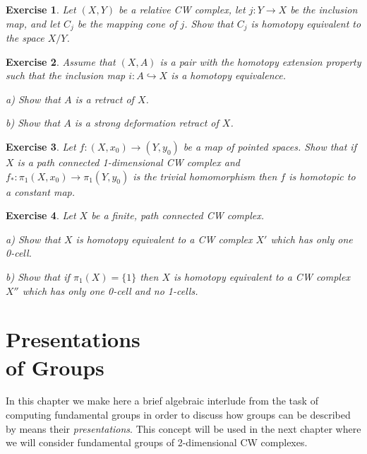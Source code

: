 \documentclass[11pt, letterpaper, oneside]{report}
\renewcommand{\chaptermark}[1]{\markboth{#1}{}}
\theoremstyle{pplain}
\theoremstyle{ddefinition}
\theoremstyle{nnn}
\theoremstyle{eexercise}
\newtheorem{exercise}{Exercise}[chapter]
\newcommand{\hra}{\hookrightarrow}
\begin{document}
\begin{exercise}
Let $(X, Y)$ be a relative CW complex, let $j\colon Y \to X$ be the inclusion map, 
and let $C_{j}$ be the mapping cone of $j$. Show that $C_{j}$ is homotopy equivalent to 
the space $X/Y$. 
\end{exercise}


\begin{exercise}
Assume that  $(X, A)$ is a pair  with  the homotopy extension property such that  
the inclusion map $i\colon A \hra X$  is a homotopy equivalence.  

a) Show that $A$ is a retract of $X$. 

b) Show that $A$ is a strong deformation retract of $X$. 
\end{exercise}


\begin{exercise}
Let $f\colon (X, x_{0}) \to (Y, y_{0})$ be a map of pointed spaces. Show that if $X$ is a path connected 
1-dimensional CW complex and $f_{\ast}\colon \pi_{1}(X, x_{0}) \to \pi_{1}(Y, y_{0})$ is the trivial homomorphism 
then $f$ is homotopic to a constant map. 
\end{exercise}

\begin{exercise}
Let $X$ be a finite, path connected CW complex. 

a) Show that $X$ is homotopy equivalent to a CW complex $X'$ which has only one 0-cell. 

b) Show that if $\pi_{1}(X) = \{1\}$ then $X$ is homotopy equivalent to a CW complex $X''$  which 
has only one 0-cell and no 1-cells. 
\end{exercise}



\newpage

\chapter[Presentations of Groups]{Presentations \\ of Groups}
\chaptermark{Presentations of Groups}
\label{PRESENTOFGPS CHAPTER}

In this  chapter  we make here a brief algebraic interlude  from the task of computing 
fundamental groups in order to discuss how groups can be described by means 
their \emph{presentations}. This concept will be used in the next chapter where 
we will consider fundamental groups of 2-dimensional CW complexes.
\end{document}
